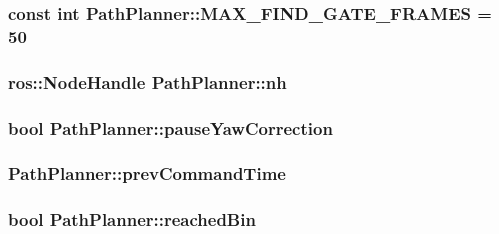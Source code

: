\subsubsection[{\texorpdfstring{M\+A\+X\+\_\+\+F\+I\+N\+D\+\_\+\+G\+A\+T\+E\+\_\+\+F\+R\+A\+M\+ES}{MAX_FIND_GATE_FRAMES}}]{\setlength{\rightskip}{0pt plus 5cm}const int Path\+Planner\+::\+M\+A\+X\+\_\+\+F\+I\+N\+D\+\_\+\+G\+A\+T\+E\+\_\+\+F\+R\+A\+M\+ES = 50}\hypertarget{classPathPlanner_ada301b950a4d1b14acd2477fbc5f73df}{}\label{classPathPlanner_ada301b950a4d1b14acd2477fbc5f73df}
\subsubsection[{\texorpdfstring{nh}{nh}}]{\setlength{\rightskip}{0pt plus 5cm}ros\+::\+Node\+Handle Path\+Planner\+::nh}\hypertarget{classPathPlanner_a3728ed52563a28d32c19efc157771e96}{}\label{classPathPlanner_a3728ed52563a28d32c19efc157771e96}
\subsubsection[{\texorpdfstring{pause\+Yaw\+Correction}{pauseYawCorrection}}]{\setlength{\rightskip}{0pt plus 5cm}bool Path\+Planner\+::pause\+Yaw\+Correction}\hypertarget{classPathPlanner_a15a968b0bc50d230bbc22e9099377504}{}\label{classPathPlanner_a15a968b0bc50d230bbc22e9099377504}
\subsubsection[{\texorpdfstring{prev\+Command\+Time}{prevCommandTime}}]{ Path\+Planner\+::prev\+Command\+Time}\hypertarget{classPathPlanner_a4802cdb753da4fa47854e33f3220db84}{}\label{classPathPlanner_a4802cdb753da4fa47854e33f3220db84}
\subsubsection[{\texorpdfstring{reached\+Bin}{reachedBin}}]{\setlength{\rightskip}{0pt plus 5cm}bool Path\+Planner\+::reached\+Bin}\hypertarget{classPathPlanner_a30fb3f87413d9204db076f92b8df064f}{}\label{classPathPlanner_a30fb3f87413d9204db076f92b8df064f}
